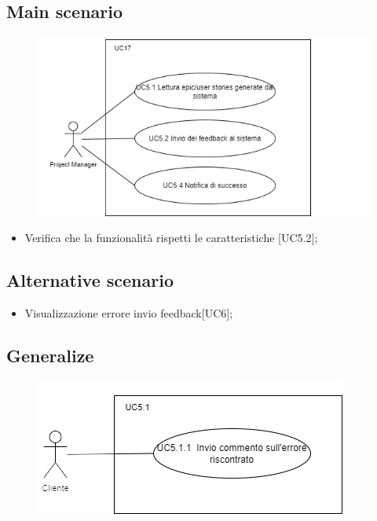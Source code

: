 \documentclass{article}
\begin{document}
    \subsection*{Main scenario}
        \begin{figure}[h]
            \centering
            \includegraphics{./imgUML/UC5-zoom.png}
            \label{fig:immagine}
        \end{figure}
        \begin{itemize}
            \item Verifica che la funzionalità rispetti le caratteristiche [UC5.2];
        \end{itemize}
        
    \subsection*{Alternative scenario}
    \begin{itemize}
        \item Visualizzazione errore invio feedback[UC6];
    \end{itemize}

    \subsection*{Generalize}
    \begin{figure}[h]
            \centering
            \includegraphics{./imgUML/UC5-zoom1.png}
            \label{fig:immagine}
        \end{figure}
\end{document}
